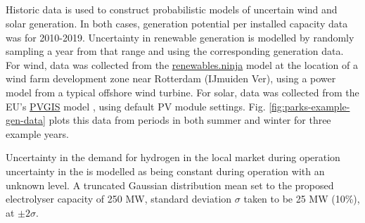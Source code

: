 \subsection{} \label{sec:parks-prob-gen-load}




Historic data is used to construct probabilistic models of uncertain wind and solar generation. In both cases, generation potential per installed capacity data was  for 2010-2019. Uncertainty in renewable generation is modelled by randomly sampling a year from that range and using the corresponding generation data. For wind, data was collected from the \href{https://www.renewables.ninja/}{renewables.ninja} model  at the location of a wind farm development zone near Rotterdam (IJmuiden Ver), using a power model from a typical offshore wind turbine. For solar, data was collected from the EU's \href{https://joint-research-centre.ec.europa.eu/photovoltaic-geographical-information-system-pvgis_en}{PVGIS} model \citep{jrceuproeancommission2017JRCPhotovoltaicGeographical}, using default PV module settings.
Fig. \ref{fig:parks-example-gen-data} plots this data from periods in both summer and winter for three example years.

Uncertainty in the demand for hydrogen in the local market during operation  uncertainty in the 
 is modelled as being constant during operation with an unknown level. A truncated Gaussian distribution  mean set to the proposed electrolyser capacity of 250 MW,  standard deviation $\sigma$ taken to be 25 MW (10\%),  at $\pm2\sigma$. %

